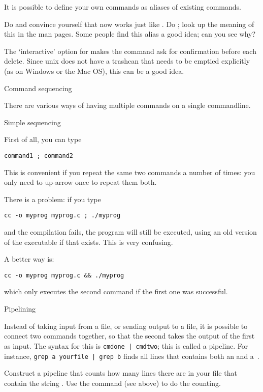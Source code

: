 It is possible to define your own commands as aliases of existing
commands.

\begin{exercise}
  Do  and convince yourself that now  works
  just like . Do ; look up the meaning of
  this in the man pages. Some people find this alias a good idea; can
  you see why?
\end{exercise}
\begin{outcome}
  The  `interactive' option for  makes the command ask for
  confirmation before each delete. Since unix does not have a trashcan
  that needs to be emptied explicitly (as on Windows or the Mac OS),
  this can be a good idea.
\end{outcome}

 {Command sequencing}
\label{tut:unix-bq}

There are various ways of having multiple commands on a single
commandline.

 {Simple sequencing}

First of all, you can type
\begin{verbatim}
command1 ; command2
\end{verbatim}
This is convenient if you repeat the same two commands a number of
times: you only need to up-arrow once to repeat them both.

There is a problem: if you type
\begin{verbatim}
cc -o myprog myprog.c ; ./myprog
\end{verbatim}
and the compilation fails, the program will still be executed,
using an old version of the executable if that exists. This is very
confusing.

A better way is:
\begin{verbatim}
cc -o myprog myprog.c && ./myprog
\end{verbatim}
which only executes the second command if the first one was
successful.

 {Pipelining}

Instead of taking input from a file, or sending output to a file, it
is possible to connect two commands together, so that the second takes
the output of the first as input. The syntax for this is
\verb+cmdone | cmdtwo+; this is called a pipeline. For instance,
\verb+grep a yourfile | grep b+ finds all lines that contains both an
 and a~.

\begin{exercise}
  Construct a pipeline that counts how many lines there are in your
  file that contain the string . Use the  command (see
  above) to do the counting.
\end{exercise}


